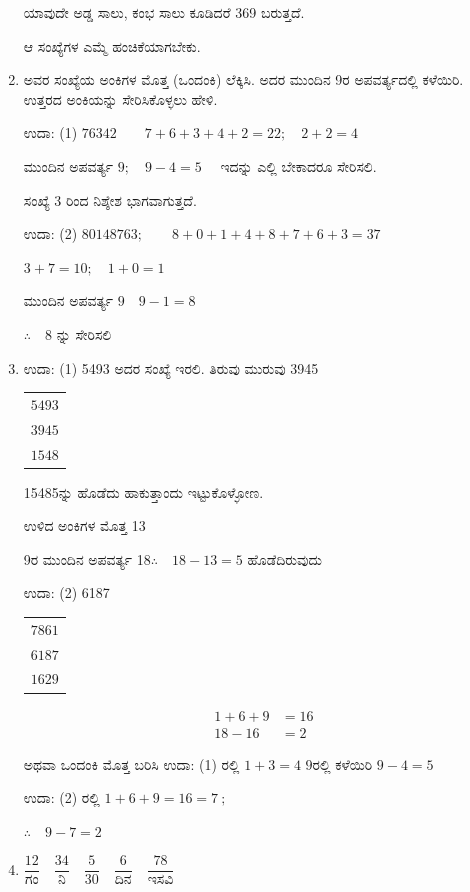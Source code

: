 \begin{enumerate}
ಯಾವುದೇ ಅಡ್ಡ ಸಾಲು, ಕಂಭ ಸಾಲು ಕೂಡಿದರೆ 369 ಬರುತ್ತದೆ. 

ಆ ಸಂಖ್ಯೆಗಳ ಎಮ್ಮೆ ಹಂಚಿಕೆಯಾಗಬೇಕು. 

\item ಅವರ ಸಂಖ್ಯೆಯ ಅಂಕಿಗಳ ಮೊತ್ತ (ಒಂದಂಕಿ) ಲೆಕ್ಕಿಸಿ. ಅದರ ಮುಂದಿನ 9ರ ಅಪವರ್ತ್ಯದಲ್ಲಿ ಕಳೆಯಿರಿ. ಉತ್ತರದ ಅಂಕಿಯನ್ನು ಸೇರಿಸಿಕೊಳ್ಳಲು ಹೇಳಿ. 

ಉದಾ: (1) $76342\qquad 7+6+3+4+2 = 22;\quad 2+2 = 4$

ಮುಂದಿನ ಅಪವರ್ತ್ಯ $9;\quad 9 - 4 = 5\quad$ ಇದನ್ನು ಎಲ್ಲಿ ಬೇಕಾದರೂ ಸೇರಿಸಲಿ. 

ಸಂಖ್ಯೆ 3 ರಿಂದ ನಿಶ್ಶೇಶ ಭಾಗವಾಗುತ್ತದೆ.   

ಉದಾ: (2) $80148763;\qquad 8+0+1+4+8+7+6+3 = 37$

$3 + 7 = 10;\quad 1 + 0 = 1$

ಮುಂದಿನ ಅಪವರ್ತ್ಯ $9\quad 9 - 1 = 8$

$\therefore\quad 8$ ನ್ನು ಸೇರಿಸಲಿ 

\item ಉದಾ: (1) 5493 ಅದರ ಸಂಖ್ಯೆ ಇರಲಿ. ತಿರುವು ಮುರುವು 3945

\begin{tabular}[t]{l}
$5493$\\
$3945$\\
\hline
$1548$
\end{tabular}

1548\quad 5ನ್ನು ಹೊಡೆದು ಹಾಕುತ್ತಾಂದು ಇಟ್ಟುಕೊಳ್ಳೋಣ. 

ಉಳಿದ ಅಂಕಿಗಳ ಮೊತ್ತ 13

9ರ ಮುಂದಿನ ಅಪವರ್ತ್ಯ 18\qquad $\therefore\quad 18 - 13 = 5$ ಹೊಡೆದಿರುವುದು

ಉದಾ: (2) 6187

\begin{tabular}[t]{l}
$7861$\\
$6187$\\
\hline
$1629$
\end{tabular}
\begin{align*}
1 + 6 + 9 & = 16\\
18 - 16 & = 2
\end{align*}

ಅಥವಾ ಒಂದಂಕಿ ಮೊತ್ತ ಬರಿಸಿ ಉದಾ: (1) ರಲ್ಲಿ $1 + 3 = 4$ $9$ರಲ್ಲಿ ಕಳೆಯಿರಿ $9 - 4 = 5$

ಉದಾ: (2) ರಲ್ಲಿ $1 + 6 + 9 = 16 = 7~;$

$\therefore\quad 9 - 7 = 2$

\item $\dfrac{12}{\text{ಗಂ}}\quad \dfrac{34}{\text{ನಿ}}\quad \dfrac{5}{30}\quad \dfrac{6}{\text{ದಿನ}}\quad \dfrac{78}{\text{ಇಸವಿ}}$


\end{enumerate}
